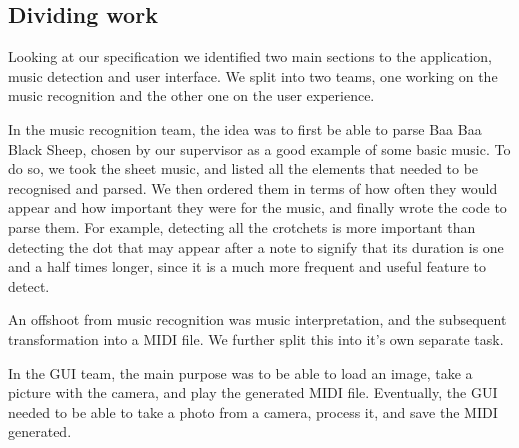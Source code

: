 \subsection{Dividing work}
Looking at our specification we identified two main sections to the application, music detection and user interface. We split into two teams, one working on the music recognition and the other one on the user experience. 
 
In the music recognition team, the idea was to first be able to parse Baa Baa Black Sheep, chosen by our supervisor as a good example of some basic music. To do so, we took the sheet music, and listed all the elements that needed to be recognised and parsed. We then ordered them in terms of how often they would appear and how important they were for the music, and finally wrote the code to parse them. For example, detecting all the crotchets is more important than detecting the dot that may appear after a note to signify that its duration is one and a half times longer, since it is a much more frequent and useful feature to detect.

An offshoot from music recognition was music interpretation, and the subsequent transformation into a MIDI file. We further split this into it's own separate task.

In the GUI team, the main purpose was to be able to load an image, take a picture with the camera, and play the generated MIDI file. Eventually, the GUI needed to be able to take a photo from a camera, process it, and save the MIDI generated.